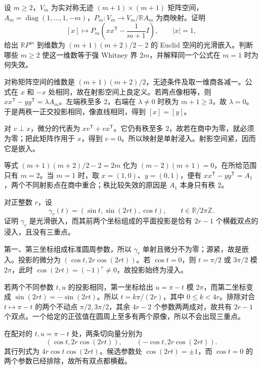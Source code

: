 \begin{exercise}\label{g2:ex:projective-rank-model}
	设 \(m\ge2\)，\(V_m\) 为实对称无迹 \((m+1)\times(m+1)\) 矩阵空间，\(A_m=\operatorname{diag}(1,\ldots,1,-m)\)，\(P_m:V_m\to V_m/\mathbb RA_m\) 为商映射。证明
	\[
		[x]\longmapsto P_m\left(xx^{\mathsf T}-\frac1{m+1}I\right),\qquad |x|=1,
	\]
	给出 \(\mathbb RP^m\) 到维数为 \((m+1)(m+2)/2-2\) 的 Euclid 空间的光滑嵌入。判断哪些 \(m\ge2\) 使这一维数等于强 Whitney 界 \(2m\)，并解释同一个公式在 \(m=1\) 时为何失效。
\end{exercise}
\begin{solution}
	对称矩阵空间的维数是 \((m+1)(m+2)/2\)，无迹条件及取一维商各减一。公式在 \(x\) 和 \(-x\) 处相同，故在射影空间上良定义。若两点像相等，则 \(xx^{\mathsf T}-yy^{\mathsf T}=\lambda A_m\)。左端秩至多 \(2\)，右端在 \(\lambda\ne0\) 时秩为 \(m+1\ge3\)，故 \(\lambda=0\)。于是两秩一正交投影相同，像直线相同，得到 \([x]=[y]\)。

	对 \(v\perp x\)，微分的代表为 \(xv^{\mathsf T}+vx^{\mathsf T}\)。它仍有秩至多 \(2\)，故若在商中为零，就必须为零；把此矩阵作用于 \(x\)，得到 \(v=0\)。所以映射是单射浸入。射影空间紧，因而它是嵌入。

	等式 \((m+1)(m+2)/2-2=2m\) 化为 \((m-2)(m+1)=0\)，在所给范围只有 \(m=2\)。当 \(m=1\) 时，取 \(x=(1,0)\)、\(y=(0,1)\)，便有 \(xx^{\mathsf T}-yy^{\mathsf T}=A_1\)，两个不同射影点在商中重合；秩比较失效的原因是 \(A_1\) 本身只有秩 \(2\)。
\end{solution}

\begin{exercise}\label{g2:ex:projection-many-double-points}
	对正整数 \(r\)，设
	\[
		\gamma_r(t)=(\sin t,\sin(2rt),\cos t),\qquad t\in\mathbb R/2\pi\mathbb Z.
	\]
	证明 \(\gamma_r\) 是光滑嵌入，而其前两个坐标组成的平面投影是恰有 \(2r-1\) 个横截双点的浸入，且没有三重点。
\end{exercise}
\begin{solution}
	第一、第三坐标组成标准圆周参数，所以 \(\gamma_r\) 单射且微分不为零；源紧，故是嵌入。投影的微分为 \((\cos t,2r\cos(2rt))\)。若 \(\cos t=0\)，则 \(t=\pi/2\) 或 \(3\pi/2\) 模 \(2\pi\)，此时 \(\cos(2rt)=(-1)^r\ne0\)，故投影始终为浸入。

	若两个不同参数 \(t,u\) 的投影相同，第一坐标给出 \(u=\pi-t\) 模 \(2\pi\)，而第二坐标变成 \(\sin(2rt)=-\sin(2rt)\)。所以 \(t=k\pi/(2r)\)，其中 \(0\le k<4r\)。排除对合 \(t\mapsto\pi-t\) 的两个不动点 \(\pi/2,3\pi/2\)，其余 \(4r-2\) 个参数两两成对，故共有 \(2r-1\) 个双点。一个给定的正弦值在圆周上至多有两个原像，所以不会出现三重点。

	在配对的 \(t,u=\pi-t\) 处，两条切向量分别为
	\[
		(\cos t,2r\cos(2rt)),\qquad(-\cos t,2r\cos(2rt)).
	\]
	其行列式为 \(4r\cos t\cos(2rt)\)。候选参数处 \(\cos(2rt)=\pm1\)，而 \(\cos t=0\) 的两个参数已经排除，故所有双点都横截。
\end{solution}

